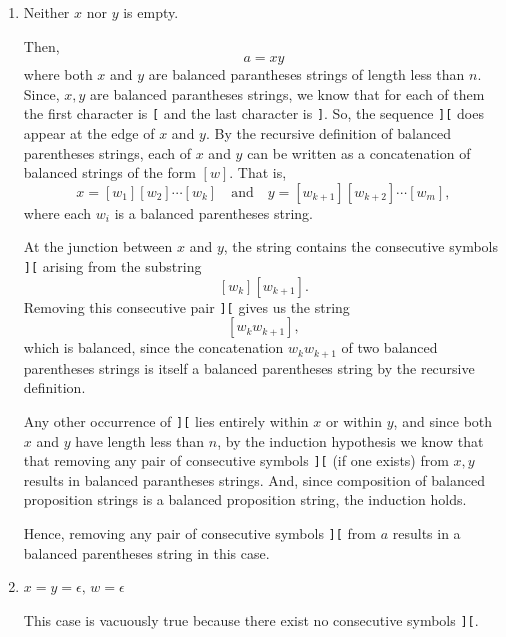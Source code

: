 \documentclass[12pt]{article}
\begin{document}
\begin{solution}
\begin{enumerate}
\begin{enumerate}
            Since, $w$ is a balanced parantheses string, we know that the first character is \texttt{[} and the last character is \texttt{]}. So, the sequence \texttt{][} doesn't appear at the edges of $a$. 

            Hence, we know that if the pair of consecutive symbols \texttt{][} exists, it exists inside $w$. But since length of $w$ is $n-2$, by the induction hypothesis we know that removing any pair of consecutive symbols \texttt{][} (if one exists) from $w$ results in a balanced parantheses string. Let the resultant balanced parantheses string be $w'$. Putting back the symbols \texttt{[]} spanning $w$, we get $[w']$, another balanced parantheses string. Hence, the induction holds. 

            \item Neither $x$ nor $y$ is empty. 
            
            Then, 
            \[a = xy\]
            where both $x$ and $y$ are balanced parantheses strings of length less than $n$. Since, $x, y$ are balanced parantheses strings, we know that for each of them the first character is \texttt{[} and the last character is \texttt{]}. So, the sequence \texttt{][} does appear at the edge of $x$ and $y$.  By the recursive definition of balanced parentheses strings, each of $x$ and $y$ can be written as a concatenation of balanced strings of the form $[w]$. That is,
            \[x = [w_1][w_2]\cdots[w_k]\quad \text{and} \quad y = [w_{k+1}][w_{k+2}]\cdots[w_m],\]
            where each $w_i$ is a balanced parentheses string.

            At the junction between $x$ and $y$, the string contains the consecutive symbols \texttt{][} arising from the substring
            \[
            [w_k][w_{k+1}].
            \]
            Removing this consecutive pair \texttt{][} gives us the string
            \[
            [w_k w_{k+1}],
            \]
            which is balanced, since the concatenation $w_k w_{k+1}$ of two balanced parentheses strings is itself
            a balanced parentheses string by the recursive definition.

            Any other occurrence of \texttt{][} lies entirely within $x$ or within $y$, and since both $x$ and $y$ have length less than $n$, by the induction hypothesis we know that that removing any pair of consecutive symbols \texttt{][} (if one exists) from $x, y$ results in balanced parantheses strings. And, since composition of balanced proposition strings is a balanced proposition string, the induction holds. 
            
            Hence, removing any pair of consecutive symbols
            \texttt{][} from $a$ results in a balanced parentheses string in this case.

            \item $x = y = \epsilon, \, w = \epsilon$
            
            This case is vacuously true because there exist no consecutive symbols \texttt{][}. 
        \end{enumerate}
    \end{enumerate}
\end{solution}
\end{document}
